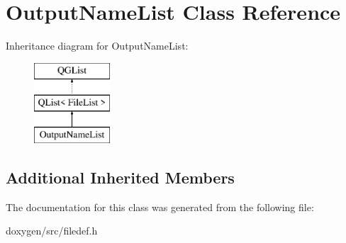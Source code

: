 \hypertarget{class_output_name_list}{}\section{Output\+Name\+List Class Reference}
\label{class_output_name_list}
Inheritance diagram for Output\+Name\+List\+:\begin{figure}[H]
\begin{center}
\leavevmode
\includegraphics[height=3.000000cm]{class_output_name_list}
\end{center}
\end{figure}
\subsection*{Additional Inherited Members}


The documentation for this class was generated from the following file\+:\begin{DoxyCompactItemize}
\item 
doxygen/src/filedef.\+h\end{DoxyCompactItemize}
